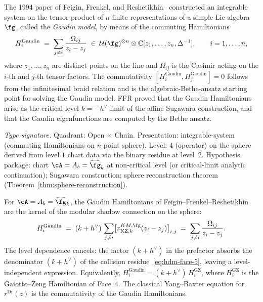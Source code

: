 The 1994 paper of Feigin, Frenkel, and Reshetikhin~\cite{FFR94}
constructed an integrable system on the tensor product of $n$ finite
representations of a simple Lie algebra~$\fg$, called the
\emph{Gaudin model}, by means of the commuting Hamiltonians
\begin{equation}\label{eq:hdm-gaudin-hamiltonians}
H_i^{\mathrm{Gaudin}}
\;=\;
\sum_{j \neq i} \frac{\Omega_{ij}}{z_i - z_j}
\;\in\;
\mathcal{U}(\fg)^{\otimes n} \otimes \mathbb{C}[z_1, \ldots, z_n,
\Delta^{-1}],
\qquad
i = 1, \ldots, n,
\end{equation}
where $z_1, \ldots, z_n$ are distinct points on the line and
$\Omega_{ij}$ is the Casimir acting on the $i$-th and $j$-th tensor
factors. The commutativity $[H_i^{\mathrm{Gaudin}}, H_j^{\mathrm{Gaudin}}] = 0$
follows from the infinitesimal braid relation and is the
algebraic-Bethe-ansatz starting point for solving the Gaudin model.
FFR proved that the Gaudin Hamiltonians arise as the critical-level
$k = -h^\vee$ limit of the affine Sugawara construction, and that
the Gaudin eigenfunctions are computed by the Bethe ansatz.

\begin{theorem}
\label{thm:hdm-face-7}
\emph{Type signature.} Quadrant: Open $\times$ Chain. Presentation:
integrable-system (commuting Hamiltonians on $n$-point sphere).
Level: $4$ (operator) on the sphere derived from level $1$ chart
data via the binary residue at level~$2$. Hypothesis package: chart
$\cA = A_b = \widehat{\fg}_k$ at non-critical level (or critical-limit
analytic continuation); Sugawara construction; sphere reconstruction
theorem (Theorem~\textup{\ref{thm:sphere-reconstruction}}).

For $\cA = A_b = \widehat{\fg}_k$, the Gaudin Hamiltonians of
Feigin--Frenkel--Reshetikhin are the kernel of the modular shadow
connection on the sphere:
\begin{equation}\label{eq:hdm-face-7}
H_i^{\mathrm{Gaudin}}
\;=\;
(k+h^\vee)\,
\sum_{j \neq i} \bigl[r^{KM,\fg}_{\mathrm{KZ},k}(z_i - z_j)\bigr]_{i,j}
\;=\;
\sum_{j \neq i} \frac{\Omega_{ij}}{z_i - z_j}.
\end{equation}
The level dependence cancels: the factor $(k+h^\vee)$ in the
prefactor absorbs the denominator $(k+h^\vee)$ of the collision
residue~\eqref{eq:hdm-face-5}, leaving a level-independent
expression.
Equivalently, $H_i^{\mathrm{Gaudin}} = (k+h^\vee)\, H_i^{\mathrm{GZ}}$,
where $H_i^{\mathrm{GZ}}$ is the Gaiotto--Zeng Hamiltonian of
Face~4. The classical Yang--Baxter equation for $r^{\mathrm{Dr}}(z)$
is the commutativity of the Gaudin Hamiltonians.
\end{theorem}

